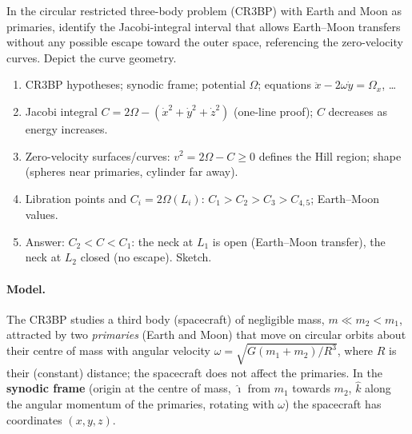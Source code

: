 \begin{qbox}
In the circular restricted three-body problem (CR3BP) with Earth and Moon as primaries, identify the Jacobi-integral
interval that allows Earth--Moon transfers without any possible escape toward the outer space, referencing the
zero-velocity curves. Depict the curve geometry.
\end{qbox}

\begin{outline}
\begin{enumerate}
\item CR3BP hypotheses; synodic frame; potential $\Omega$; equations $\ddot x-2\omega\dot y=\Omega_x$, \dots
\item Jacobi integral $C=2\Omega-(\dot x^2+\dot y^2+\dot z^2)$ (one-line proof); $C$ decreases as energy increases.
\item Zero-velocity surfaces/curves: $v^2=2\Omega-C\ge0$ defines the Hill region; shape (spheres near primaries, cylinder far away).
\item Libration points and $C_i=2\Omega(L_i)$: $C_1>C_2>C_3>C_{4,5}$; Earth--Moon values.
\item Answer: $C_2<C<C_1$: the neck at $L_1$ is open (Earth--Moon transfer), the neck at $L_2$ closed (no escape). Sketch.
\end{enumerate}
\end{outline}

\answer
\paragraph{Model.} The CR3BP studies a third body (spacecraft) of negligible mass, $m\ll m_2<m_1$, attracted by two
\emph{primaries} (Earth and Moon) that move on circular orbits about their centre of mass with angular velocity
$\omega=\sqrt{G(m_1+m_2)/R^3}$, where $R$ is their (constant) distance; the spacecraft does not affect the primaries. In the
\textbf{synodic frame} (origin at the centre of mass, $\hat\imath$ from $m_1$ towards $m_2$, $\hat k$ along the angular momentum of the
primaries, rotating with $\omega$) the spacecraft has coordinates $(x,y,z)$.

